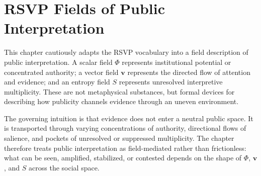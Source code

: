 
\chapter{RSVP Fields of Public Interpretation}
\label{ch:ch080}

This chapter cautiously adapts the RSVP vocabulary into a field description of public interpretation. A scalar field \(\Phi\) represents institutional potential or concentrated authority; a vector field \(\mathbf v\) represents the directed flow of attention and evidence; and an entropy field \(S\) represents unresolved interpretive multiplicity. These are not metaphysical substances, but formal devices for describing how publicity channels evidence through an uneven environment.

The governing intuition is that evidence does not enter a neutral public space. It is transported through varying concentrations of authority, directional flows of salience, and pockets of unresolved or suppressed multiplicity. The chapter therefore treats public interpretation as field-mediated rather than frictionless: what can be seen, amplified, stabilized, or contested depends on the shape of \(\Phi\), \(\mathbf v\), and \(S\) across the social space.
